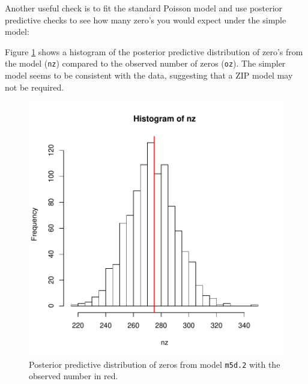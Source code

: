\documentclass{article}
\begin{document}
Another useful check is to fit the standard Poisson model and use posterior predictive checks to see how many zero's you would expect under the simple model:

\begin{Schunk}
\end{Schunk}

Figure \ref{PPZIP}  shows a histogram of the posterior predictive distribution of zero's from the model (\texttt{nz}) compared to the observed number of zeros (\texttt{oz}). The simpler model seems to be consistent with the data, suggesting that a ZIP model may not be required.


\begin{figure}[!h]
\begin{center}
\includegraphics{Lecture5-043}
\end{center}
\caption{Posterior predictive distribution of zeros from model \texttt{m5d.2} with the observed number in red.}
\label{PPZIP}
\end{figure}
\end{document}
